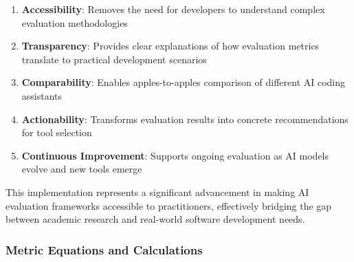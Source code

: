 \documentclass[conference]{IEEEtran}
\begin{document}
\begin{enumerate}
    \item \textbf{Accessibility}: Removes the need for developers to understand complex evaluation methodologies
    \item \textbf{Transparency}: Provides clear explanations of how evaluation metrics translate to practical development scenarios
    \item \textbf{Comparability}: Enables apples-to-apples comparison of different AI coding assistants
    \item \textbf{Actionability}: Transforms evaluation results into concrete recommendations for tool selection
    \item \textbf{Continuous Improvement}: Supports ongoing evaluation as AI models evolve and new tools emerge
\end{enumerate}

This implementation represents a significant advancement in making AI evaluation frameworks accessible to practitioners, effectively bridging the gap between academic research and real-world software development needs.

\subsubsection{Metric Equations and Calculations}
\end{document}
